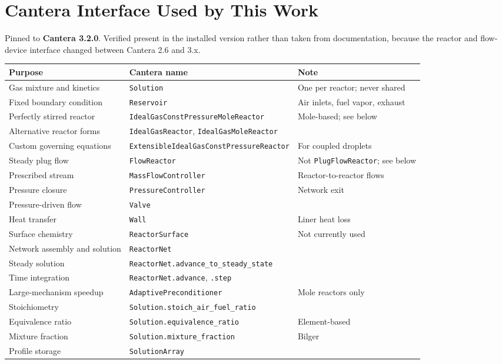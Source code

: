 \documentclass[11pt]{article}
\newcommand{\code}[1]{\nolinkurl{#1}}
\begin{document}
\appendix

\section{Cantera Interface Used by This Work}

Pinned to \textbf{Cantera 3.2.0}. Verified present in the installed version rather than
taken from documentation, because the reactor and flow-device interface changed between
Cantera 2.6 and 3.x.

\begin{center}
\begin{tabular}{lll}
\toprule
Purpose & Cantera name & Note \\
\midrule
Gas mixture and kinetics & \code{Solution} & One per reactor; never shared \\
Fixed boundary condition & \code{Reservoir} & Air inlets, fuel vapor, exhaust \\
Perfectly stirred reactor & \code{IdealGasConstPressureMoleReactor} & Mole-based; see below \\
Alternative reactor forms & \code{IdealGasReactor}, \code{IdealGasMoleReactor} & \\
Custom governing equations & \code{ExtensibleIdealGasConstPressureReactor} & For coupled droplets \\
Steady plug flow & \code{FlowReactor} & Not \code{PlugFlowReactor}; see below \\
Prescribed stream & \code{MassFlowController} & Reactor-to-reactor flows \\
Pressure closure & \code{PressureController} & Network exit \\
Pressure-driven flow & \code{Valve} & \\
Heat transfer & \code{Wall} & Liner heat loss \\
Surface chemistry & \code{ReactorSurface} & Not currently used \\
Network assembly and solution & \code{ReactorNet} & \\
Steady solution & \code{ReactorNet.advance_to_steady_state} & \\
Time integration & \code{ReactorNet.advance}, \code{.step} & \\
Large-mechanism speedup & \code{AdaptivePreconditioner} & Mole reactors only \\
Stoichiometry & \code{Solution.stoich_air_fuel_ratio} & \\
Equivalence ratio & \code{Solution.equivalence_ratio} & Element-based \\
Mixture fraction & \code{Solution.mixture_fraction} & Bilger \\
Profile storage & \code{SolutionArray} & \\
\bottomrule
\end{tabular}
\end{center}
\end{document}
